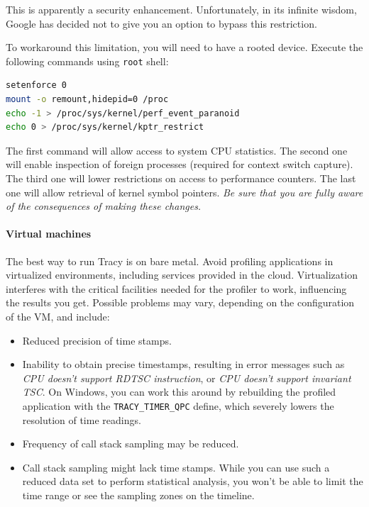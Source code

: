\documentclass[hidelinks,titlepage,a4paper,twoside]{article}
\begin{document}
This is apparently a security enhancement. Unfortunately, in its infinite wisdom, Google has decided not to give you an option to bypass this restriction.

To workaround this limitation, you will need to have a rooted device. Execute the following commands using \texttt{root} shell:

\begin{lstlisting}[language=sh]
setenforce 0
mount -o remount,hidepid=0 /proc
echo -1 > /proc/sys/kernel/perf_event_paranoid
echo 0 > /proc/sys/kernel/kptr_restrict
\end{lstlisting}

The first command will allow access to system CPU statistics. The second one will enable inspection of foreign processes (required for context switch capture). The third one will lower restrictions on access to performance counters. The last one will allow retrieval of kernel symbol pointers. \emph{Be sure that you are fully aware of the consequences of making these changes.}

\paragraph{Virtual machines}

The best way to run Tracy is on bare metal. Avoid profiling applications in virtualized environments, including services provided in the cloud. Virtualization interferes with the critical facilities needed for the profiler to work, influencing the results you get. Possible problems may vary, depending on the configuration of the VM, and include:

\begin{itemize}
\item Reduced precision of time stamps.
\item Inability to obtain precise timestamps, resulting in error messages such as \emph{CPU doesn't support RDTSC instruction}, or \emph{CPU doesn't support invariant TSC}. On Windows, you can work this around by rebuilding the profiled application with the \texttt{TRACY\_TIMER\_QPC} define, which severely lowers the resolution of time readings.
\item Frequency of call stack sampling may be reduced.
\item Call stack sampling might lack time stamps. While you can use such a reduced data set to perform statistical analysis, you won't be able to limit the time range or see the sampling zones on the timeline.
\end{itemize}
\end{document}
